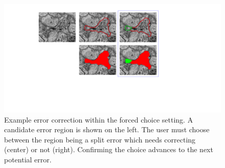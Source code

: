 \begin{figure}[t]
\includegraphics[width=\linewidth]{gfx/user_interface_split.pdf}
\caption{Example error correction within the forced choice setting. A candidate error region is shown on the left. The user must choose between the region being a split error which needs correcting (center) or not (right). Confirming the choice advances to the next potential error.} %
\label{fig:ui}
\vspace{-4mm}
\end{figure}

%
%
